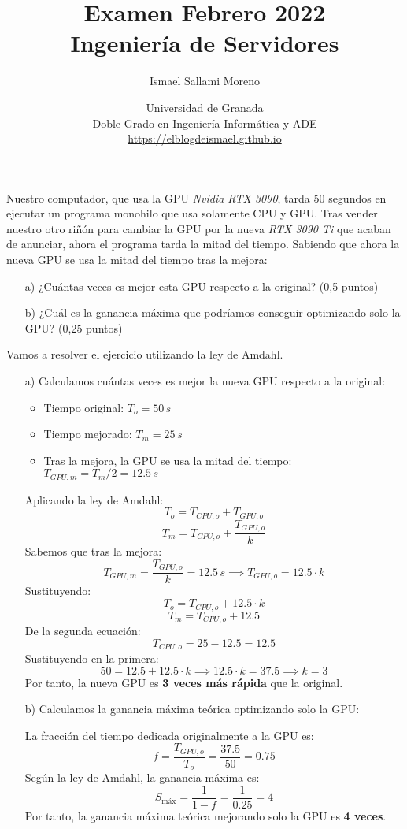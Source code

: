 \documentclass[a4paper,12pt]{article}
\title{\Huge Examen Febrero 2022\vspace{0.5cm} \\ \Large Ingeniería de Servidores}
\author{Ismael Sallami Moreno}
\date{\small Universidad de Granada\\ Doble Grado en Ingeniería Informática y ADE\\ \url{https://elblogdeismael.github.io}}
\begin{document}
\maketitle
\thispagestyle{fancy}

\vspace{1cm}

\begin{tcolorbox}[colback=gray!10, colframe=black, title=2.- (0.75 puntos)]
Nuestro computador, que usa la GPU \textit{Nvidia RTX 3090}, tarda 50 segundos en ejecutar un programa monohilo que usa solamente CPU y GPU. Tras vender nuestro otro riñón para cambiar la GPU por la nueva \textit{RTX 3090 Ti} que acaban de anunciar, ahora el programa tarda la mitad del tiempo. Sabiendo que ahora la nueva GPU se usa la mitad del tiempo tras la mejora:

\begin{enumerate}
    \item[a)] ¿Cuántas veces es mejor esta GPU respecto a la original? (0,5 puntos)
    \item[b)] ¿Cuál es la ganancia máxima que podríamos conseguir optimizando solo la GPU? (0,25 puntos)
\end{enumerate}
\end{tcolorbox}


Vamos a resolver el ejercicio utilizando la ley de Amdahl.

\begin{itemize}
    \item[a)] Calculamos cuántas veces es mejor la nueva GPU respecto a la original:

    \begin{itemize}
        \item Tiempo original: $T_o = 50\,s$
        \item Tiempo mejorado: $T_m = 25\,s$
        \item Tras la mejora, la GPU se usa la mitad del tiempo: $T_{GPU,m} = T_m/2 = 12.5\,s$
    \end{itemize}

    Aplicando la ley de Amdahl:
    \[
    T_o = T_{CPU,o} + T_{GPU,o}
    \]
    \[
    T_m = T_{CPU,o} + \frac{T_{GPU,o}}{k}
    \]
    Sabemos que tras la mejora:
    \[
    T_{GPU,m} = \frac{T_{GPU,o}}{k} = 12.5\,s \implies T_{GPU,o} = 12.5 \cdot k
    \]
    Sustituyendo:
    \[
    T_o = T_{CPU,o} + 12.5 \cdot k
    \]
    \[
    T_m = T_{CPU,o} + 12.5
    \]
    De la segunda ecuación:
    \[
    T_{CPU,o} = 25 - 12.5 = 12.5
    \]
    Sustituyendo en la primera:
    \[
    50 = 12.5 + 12.5 \cdot k \implies 12.5 \cdot k = 37.5 \implies k = 3
    \]
    Por tanto, la nueva GPU es \textbf{3 veces más rápida} que la original.

    \item[b)] Calculamos la ganancia máxima teórica optimizando solo la GPU:

    La fracción del tiempo dedicada originalmente a la GPU es:
    \[
    f = \frac{T_{GPU,o}}{T_o} = \frac{37.5}{50} = 0.75
    \]
    Según la ley de Amdahl, la ganancia máxima es:
    \[
    S_{\text{máx}} = \frac{1}{1 - f} = \frac{1}{0.25} = 4
    \]
    Por tanto, la ganancia máxima teórica mejorando solo la GPU es \textbf{4 veces}.
\end{itemize}
\end{document}
